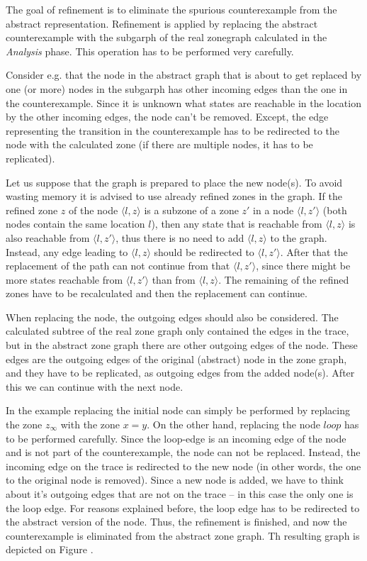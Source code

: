 The goal of refinement is to eliminate the spurious counterexample from the abstract representation. Refinement is applied by replacing the abstract counterexample with the subgarph of the real zonegraph calculated in the \emph{Analysis} phase. This operation has to be performed very carefully.

Consider e.g. that the node in the abstract graph that is about to get replaced by one (or more) nodes in the subgarph has other incoming edges than the one in the counterexample. Since it is unknown what states are reachable in the location by the other incoming edges, the node can't be removed. Except, the edge representing the transition in the counterexample has to be redirected to the node with the calculated zone (if there are multiple nodes, it has to be replicated).

Let us suppose that the graph is prepared to place the new node(s). To avoid wasting memory it is advised to use already refined zones in the graph. If the refined zone $z$ of the node $\langle l,z \rangle$ is a subzone of a zone $z'$ in a node $\langle l,z' \rangle$ (both nodes
contain the same location $l$), then any state that is reachable from $\langle l,z \rangle$ is also reachable from $\langle l,z' \rangle$, thus there is no need to add  $\langle l,z \rangle$ to the graph. Instead, any edge leading to  $\langle l,z \rangle$ should be redirected to $\langle l,z' \rangle$. After that the replacement of the path can not continue from that $\langle l,z' \rangle$, since there might be more states reachable from $\langle l,z' \rangle$ than from $\langle l,z \rangle$. The remaining of the refined zones have to be recalculated and then the replacement can continue.

When replacing the node, the outgoing edges should also be considered. The calculated subtree of the real zone graph only contained the edges in the trace, but in the abstract zone graph there are other outgoing edges of the node. These edges are the outgoing edges of the original (abstract) node in the zone graph, and they have to be replicated, as outgoing edges from the added node(s). After this we can continue with the next node.

\begin{example}
In the example replacing the initial node can simply be performed by replacing the zone $z_\infty$ with the zone $x=y$. On the other hand, replacing the node $loop$ has to be performed carefully. Since the loop-edge is an incoming edge of the node and is not part of the counterexample, the node can not be replaced. Instead, the incoming edge on the trace is redirected to the new node (in other words, the one to the original node is removed). Since a new node is added, we have to think about it's outgoing edges that are not on the trace -- in this case the only one is the loop edge. For reasons explained before, the loop edge has to be redirected to the abstract version of the node. Thus, the refinement is finished, and now the counterexample is eliminated from the abstract zone graph. Th resulting graph is depicted on Figure .
\end{example}


